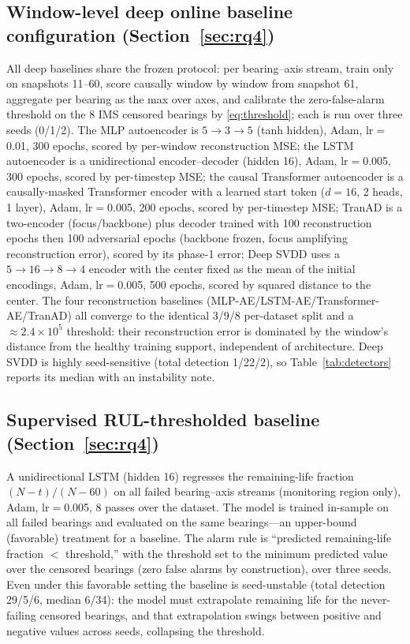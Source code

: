 \documentclass[journal]{IEEEtran}
\begin{document}
\subsection*{Window-level deep online baseline configuration (Section~\ref{sec:rq4})}
All deep baselines share the frozen protocol: per bearing--axis stream, train only on snapshots 11--60, score causally window by window from snapshot 61, aggregate per bearing as the max over axes, and calibrate the zero-false-alarm threshold on the 8 IMS censored bearings by \eqref{eq:threshold}; each is run over three seeds (0/1/2). The MLP autoencoder is $5\to3\to5$ (tanh hidden), Adam, lr$=$0.01, 300 epochs, scored by per-window reconstruction MSE; the LSTM autoencoder is a unidirectional encoder--decoder (hidden 16), Adam, lr$=$0.005, 300 epochs, scored by per-timestep MSE; the causal Transformer autoencoder is a causally-masked Transformer encoder with a learned start token ($d{=}16$, 2 heads, 1 layer), Adam, lr$=$0.005, 200 epochs, scored by per-timestep MSE; TranAD is a two-encoder (focus/backbone) plus decoder trained with 100 reconstruction epochs then 100 adversarial epochs (backbone frozen, focus amplifying reconstruction error), scored by its phase-1 error; Deep SVDD uses a $5\to16\to8\to4$ encoder with the center fixed as the mean of the initial encodings, Adam, lr$=$0.005, 500 epochs, scored by squared distance to the center. The four reconstruction baselines (MLP-AE/LSTM-AE/Transformer-AE/TranAD) all converge to the identical 3/9/8 per-dataset split and a $\approx2.4\times10^{5}$ threshold: their reconstruction error is dominated by the window's distance from the healthy training support, independent of architecture. Deep SVDD is highly seed-sensitive (total detection 1/22/2), so Table~\ref{tab:detectors} reports its median with an instability note.

\subsection*{Supervised RUL-thresholded baseline (Section~\ref{sec:rq4})}
A unidirectional LSTM (hidden 16) regresses the remaining-life fraction $(N-t)/(N-60)$ on all failed bearing--axis streams (monitoring region only), Adam, lr$=$0.005, 8 passes over the dataset. The model is trained in-sample on all failed bearings and evaluated on the same bearings---an upper-bound (favorable) treatment for a baseline. The alarm rule is ``predicted remaining-life fraction $<$ threshold,'' with the threshold set to the minimum predicted value over the censored bearings (zero false alarms by construction), over three seeds. Even under this favorable setting the baseline is seed-unstable (total detection 29/5/6, median 6/34): the model must extrapolate remaining life for the never-failing censored bearings, and that extrapolation swings between positive and negative values across seeds, collapsing the threshold.
\end{document}
